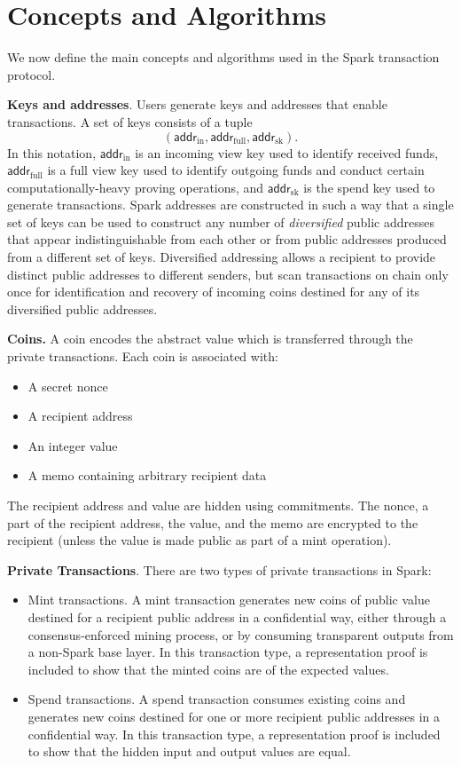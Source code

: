 \documentclass{llncs}
\newcommand{\func}[1]{\mathsf{#1}}
\newcommand{\addr}{\func{addr}}
\begin{document}
\section{Concepts and Algorithms}

We now define the main concepts and algorithms used in the Spark transaction protocol.

\textbf{Keys and addresses}. Users generate keys and addresses that enable transactions.
A set of keys consists of a tuple $$(\addr_{\text{in}}, \addr_{\text{full}}, \addr_{\text{sk}}).$$
In this notation, $\addr_{\text{in}}$ is an incoming view key used to identify received funds, $\addr_{\text{full}}$ is a full view key used to identify outgoing funds and conduct certain computationally-heavy proving operations, and $\addr_{\text{sk}}$ is the spend key used to generate transactions.
Spark addresses are constructed in such a way that a single set of keys can be used to construct any number of \textit{diversified} public addresses that appear indistinguishable from each other or from public addresses produced from a different set of keys.
Diversified addressing allows a recipient to provide distinct public addresses to different senders, but scan transactions on chain only once for identification and recovery of incoming coins destined for any of its diversified public addresses.

\textbf{Coins.} A coin encodes the abstract value which is transferred through the private transactions. Each coin is associated with:
\begin{itemize}
\item A secret nonce
\item A recipient address
\item An integer value
\item A memo containing arbitrary recipient data
\end{itemize}
The recipient address and value are hidden using commitments.
The nonce, a part of the recipient address, the value, and the memo are encrypted to the recipient (unless the value is made public as part of a mint operation).

\textbf{Private Transactions}. There are two types of private transactions in Spark:
\begin{itemize}
    \item Mint transactions.
    A mint transaction generates new coins of public value destined for a recipient public address in a confidential way, either through a consensus-enforced mining process, or by consuming transparent outputs from a non-Spark base layer.
    In this transaction type, a representation proof is included to show that the minted coins are of the expected values.
    \item Spend transactions.
    A spend transaction consumes existing coins and generates new coins destined for one or more recipient public addresses in a confidential way.
    In this transaction type, a representation proof is included to show that the hidden input and output values are equal.
\end{itemize}
\end{document}
